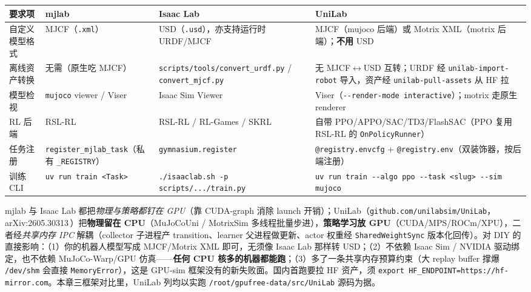 \begin{center}
\small
\begin{tabular}{@{}p{2.7cm}p{3.0cm}p{3.4cm}p{3.7cm}@{}}
\toprule
要求项 & mjlab & Isaac Lab & UniLab \\
\midrule
自定义模型格式 & MJCF（\texttt{.xml}） & USD（\texttt{.usd}），亦支持运行时 URDF/MJCF & MJCF（mujoco 后端）或 Motrix XML（motrix 后端）；\textbf{不用} USD \\
离线资产转换 & 无需（原生吃 MJCF） & \texttt{scripts/tools/convert\_urdf.py} / \texttt{convert\_mjcf.py} & 无 MJCF$\leftrightarrow$USD 互转；URDF 经 \texttt{unilab-import-robot} 导入，资产经 \texttt{unilab-pull-assets} 从 HF 拉 \\
模型检视 & \texttt{mujoco} viewer / Viser & Isaac Sim Viewer & Viser（\texttt{-{}-render-mode interactive}）；motrix 走原生 renderer \\
RL 后端 & RSL-RL & RSL-RL / RL-Games / SKRL & 自带 PPO/APPO/SAC/TD3/FlashSAC（PPO 复用 RSL-RL 的 \texttt{OnPolicyRunner}） \\
任务注册 & \texttt{register\_mjlab\_task}（私有 \texttt{\_REGISTRY}） & \texttt{gymnasium.register} & \texttt{@registry.envcfg} + \texttt{@registry.env}（双装饰器，按后端注册） \\
训练 CLI & \verb|uv run train <Task>| & \verb|./isaaclab.sh -p scripts/.../train.py| & \verb|uv run train --algo ppo --task <slug> --sim mujoco| \\
\bottomrule
\end{tabular}
\end{center}

\begin{note}
mjlab 与 Isaac Lab 都把\emph{物理与策略都钉在 GPU}（靠 CUDA-graph 消除 launch 开销）；UniLab（\verb|github.com/unilabsim/UniLab|，arXiv:2605.30313\,\cite{unilab2026}）把\textbf{物理留在 CPU}（MuJoCoUni / MotrixSim 多线程批量步进），\textbf{策略学习放 GPU}（CUDA/MPS/ROCm/XPU），二者经\emph{共享内存 IPC} 解耦（collector 子进程产 transition、learner 父进程做更新、actor 权重经 \verb|SharedWeightSync| 版本化回传）。对 DIY 的直接影响：（1）你的机器人模型写成 MJCF/Motrix XML 即可，无须像 Isaac Lab 那样转 USD；（2）不依赖 Isaac Sim / NVIDIA 驱动绑定，也不依赖 MuJoCo-Warp/GPU 仿真——\textbf{任何 CPU 核多的机器都能跑}；（3）多了一条共享内存预算约束（大 replay buffer 撑爆 \verb|/dev/shm| 会直接 \verb|MemoryError|），这是 GPU-sim 框架没有的新失败面。国内首跑要拉 HF 资产，须 \verb|export HF_ENDPOINT=https://hf-mirror.com|。本章三框架对比里，UniLab 列均以实跑 \verb|/root/gpufree-data/src/UniLab| 源码为据。
\end{note}


